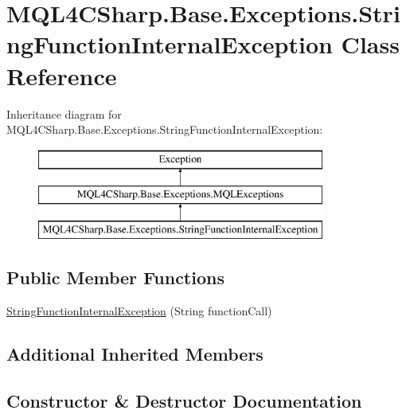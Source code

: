 \hypertarget{class_m_q_l4_c_sharp_1_1_base_1_1_exceptions_1_1_string_function_internal_exception}{}\section{M\+Q\+L4\+C\+Sharp.\+Base.\+Exceptions.\+String\+Function\+Internal\+Exception Class Reference}
\label{class_m_q_l4_c_sharp_1_1_base_1_1_exceptions_1_1_string_function_internal_exception}
Inheritance diagram for M\+Q\+L4\+C\+Sharp.\+Base.\+Exceptions.\+String\+Function\+Internal\+Exception\+:\begin{figure}[H]
\begin{center}
\leavevmode
\includegraphics[height=3.000000cm]{class_m_q_l4_c_sharp_1_1_base_1_1_exceptions_1_1_string_function_internal_exception}
\end{center}
\end{figure}
\subsection*{Public Member Functions}
\begin{DoxyCompactItemize}
\item 
\hyperlink{class_m_q_l4_c_sharp_1_1_base_1_1_exceptions_1_1_string_function_internal_exception_a6af9180973b826d923dc28a8bab4075e}{String\+Function\+Internal\+Exception} (String function\+Call)
\end{DoxyCompactItemize}
\subsection*{Additional Inherited Members}


\subsection{Constructor \& Destructor Documentation}

